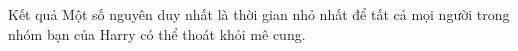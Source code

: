 Kết quả
Một số nguyên duy nhất là thời gian nhỏ nhất để tất cả mọi người trong nhóm bạn của Harry có thể thoát khỏi mê cung.